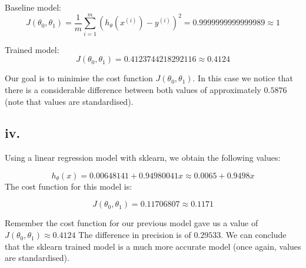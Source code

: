 \documentclass[10pt]{article}
\begin{document}
Baseline model:
\begin{equation*}
    J(\theta_{0}, \theta_{1}) = \frac{1}{m}\sum_{i=1}^{m}(h_{\theta}(x^{(i)}) - y^{(i)})^{2} = 0.9999999999999989 \approx 1
\end{equation*}

Trained model:
\begin{equation*}
    J(\theta_{0}, \theta_{1}) = 0.4123744218292116 \approx 0.4124
\end{equation*}

Our goal is to minimise the cost function $J(\theta_{0}, \theta_{1})$. In this case we notice that there is 
a considerable difference between both values of approximately $0.5876$ (note that values are standardised).

\subsection*{iv.}
Using a linear regression model with sklearn, we obtain the following values:

\begin{equation*}
    h_{\theta}(x) = 0.00648141 + 0.94980041x \approx 0.0065 + 0.9498x
\end{equation*}
The cost function for this model is:

\begin{equation*}
    J(\theta_{0}, \theta_{1}) = 0.11706807 \approx 0.1171
\end{equation*}

Remember the cost function for our previous model gave us a value of $J(\theta_{0}, \theta_{1}) \approx 0.4124$
The difference in precision is of $0.29533$. We can conclude that the sklearn trained model
is a much more accurate model (once again, values are standardised).
\end{document}

